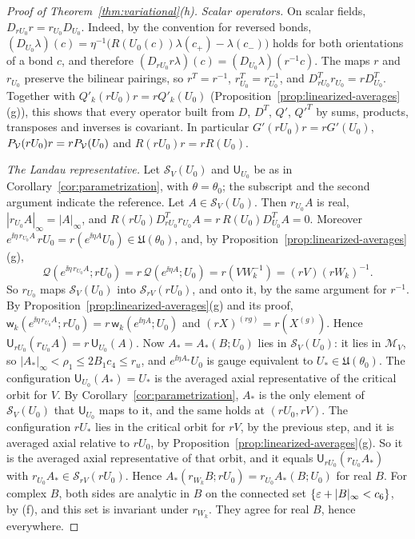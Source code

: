 \begin{proof}[Proof of Theorem~\ref{thm:variational}(h)]
\emph{Scalar operators.} On scalar fields, $D_{rU_0}r=r_{U_0}D_{U_0}$. Indeed, by the convention for reversed bonds, $(D_{U_0}\lambda)(c)=\eta^{-1}\big(R(U_0(c))\lambda(c_+)-\lambda(c_-)\big)$ holds for both orientations of a bond $c$, and therefore $(D_{rU_0}r\lambda)(c)=(D_{U_0}\lambda)(r^{-1}c)$. The maps $r$ and $r_{U_0}$ preserve the bilinear pairings, so $r^T=r^{-1}$, $r_{U_0}^T=r_{U_0}^{-1}$, and $D^T_{rU_0}r_{U_0}=rD^T_{U_0}$. Together with $Q'_k(rU_0)r=rQ'_k(U_0)$ (Proposition~\ref{prop:linearized-averages}(g)), this shows that every operator built from $D$, $D^T$, $Q'$, $Q'^T$ by sums, products, transposes and inverses is covariant. In particular $G'(rU_0)r=rG'(U_0)$, $P_\mathcal V(rU_0)r=rP_\mathcal V(U_0)$ and $R(rU_0)r=rR(U_0)$.

\emph{The Landau representative.} Let $\mathcal S_V(U_0)$ and $\mathsf U_{U_0}$ be as in Corollary~\ref{cor:parametrization}, with $\theta=\theta_0$; the subscript and the second argument indicate the reference. Let $A\in\mathcal S_V(U_0)$. Then $r_{U_0}A$ is real, $|r_{U_0}A|_\infty=|A|_\infty$, and $R(rU_0)D^T_{rU_0}r_{U_0}A=r\,R(U_0)D^T_{U_0}A=0$. Moreover $e^{\ii\eta\,r_{U_0}A}\,rU_0=r(e^{\ii\eta A}U_0)\in\mathfrak U(\theta_0)$, and, by Proposition~\ref{prop:linearized-averages}(g),
\[
\mathcal Q(e^{\ii\eta\,r_{U_0}A};rU_0)=r\,\mathcal Q(e^{\ii\eta A};U_0)=r(VW_k^{-1})=(rV)(rW_k)^{-1}.
\]
So $r_{U_0}$ maps $\mathcal S_V(U_0)$ into $\mathcal S_{rV}(rU_0)$, and onto it, by the same argument for $r^{-1}$. By Proposition~\ref{prop:linearized-averages}(g) and its proof, $\mathsf w_k(e^{\ii\eta\,r_{U_0}A};rU_0)=r\,\mathsf w_k(e^{\ii\eta A};U_0)$ and $(rX)^{(rg)}=r(X^{(g)})$. Hence $\mathsf U_{rU_0}(r_{U_0}A)=r\,\mathsf U_{U_0}(A)$. Now $A_*=A_*(B;U_0)$ lies in $\mathcal S_V(U_0)$: it lies in $\mathcal M_V$, so $|A_*|_\infty<\rho_1\le2B_1c_4\le r_u$, and $e^{\ii\eta A_*}U_0$ is gauge equivalent to $U_*\in\mathfrak U(\theta_0)$. The configuration $\mathsf U_{U_0}(A_*)=U_*$ is the averaged axial representative of the critical orbit for $V$. By Corollary~\ref{cor:parametrization}, $A_*$ is the only element of $\mathcal S_V(U_0)$ that $\mathsf U_{U_0}$ maps to it, and the same holds at $(rU_0,rV)$. The configuration $rU_*$ lies in the critical orbit for $rV$, by the previous step, and it is averaged axial relative to $rU_0$, by Proposition~\ref{prop:linearized-averages}(g). So it is the averaged axial representative of that orbit, and it equals $\mathsf U_{rU_0}(r_{U_0}A_*)$ with $r_{U_0}A_*\in\mathcal S_{rV}(rU_0)$. Hence $A_*(r_{W_k}B;rU_0)=r_{U_0}A_*(B;U_0)$ for real $B$. For complex $B$, both sides are analytic in $B$ on the connected set $\{\varepsilon+|B|_\infty<c_6\}$, by (f), and this set is invariant under $r_{W_k}$. They agree for real $B$, hence everywhere.


\end{proof}
